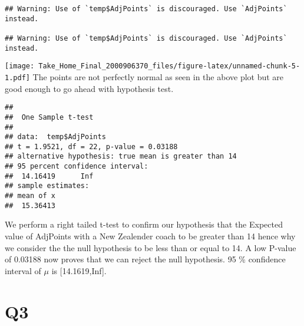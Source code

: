 \documentclass[
]{article}
\newenvironment{Shaded}{\begin{snugshade}}{\end{snugshade}}
\newcommand{\AttributeTok}[1]{\textcolor[rgb]{0.77,0.63,0.00}{#1}}
\newcommand{\DecValTok}[1]{\textcolor[rgb]{0.00,0.00,0.81}{#1}}
\newcommand{\FunctionTok}[1]{\textcolor[rgb]{0.00,0.00,0.00}{#1}}
\newcommand{\NormalTok}[1]{#1}
\newcommand{\SpecialCharTok}[1]{\textcolor[rgb]{0.00,0.00,0.00}{#1}}
\newcommand{\StringTok}[1]{\textcolor[rgb]{0.31,0.60,0.02}{#1}}
\begin{document}
\begin{Shaded}
\end{Shaded}

\begin{verbatim}
## Warning: Use of `temp$AdjPoints` is discouraged. Use `AdjPoints` instead.

## Warning: Use of `temp$AdjPoints` is discouraged. Use `AdjPoints` instead.
\end{verbatim}

\texttt{[image: Take\_Home\_Final\_2000906370\_files/figure-latex/unnamed-chunk-5-1.pdf]}
The points are not perfectly normal as seen in the above plot but are
good enough to go ahead with hypothesis test.

\begin{Shaded}
\end{Shaded}

\begin{verbatim}
## 
##  One Sample t-test
## 
## data:  temp$AdjPoints
## t = 1.9521, df = 22, p-value = 0.03188
## alternative hypothesis: true mean is greater than 14
## 95 percent confidence interval:
##  14.16419      Inf
## sample estimates:
## mean of x 
##  15.36413
\end{verbatim}

We perform a right tailed t-test to confirm our hypothesis that the
Expected value of AdjPoints with a New Zealender coach to be greater
than 14 hence why we consider the the null hypothesis to be less than or
equal to 14. A low P-value of 0.03188 now proves that we can reject the
null hypothesis. 95 \% confidence interval of \(\mu\) is
{[}14.1619,Inf{]}.

\hypertarget{q3}{%
\section{Q3}\label{q3}}
\end{document}
